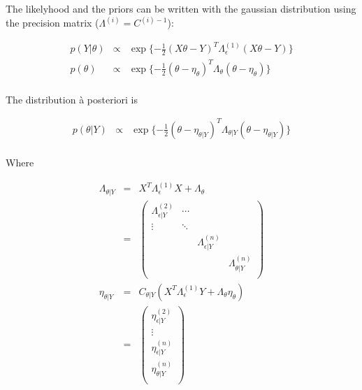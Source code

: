 \documentclass[final, paper=letter,5p,times,twocolumn]{elsarticle}
\theoremstyle{definition}
\begin{document}
The likelyhood and the priors can be written with the gaussian distribution using the precision matrix ($\Lambda^{(i)} = C^{(i)-1}$):


\begin{equation*}
  \left .
  \begin{array}{rcl}
    p(Y|\theta) & \propto & \exp\lbrace -\frac{1}{2} (X\theta - Y)^{T} \Lambda_{\epsilon}^{(1)} (X\theta - Y) \rbrace \\
    p(\theta)   & \propto & \exp\lbrace -\frac{1}{2} (\theta - \eta_{\theta})^{T} \Lambda_{\theta} (\theta - \eta_{\theta}) \rbrace \\
  \end{array}
  \right .
\end{equation*}

The distribution \`a posteriori is

\begin{equation*}
  \left .
  \begin{array}{rcl}
    p(\theta|Y) & \propto & \exp\lbrace -\frac{1}{2} (\theta - \eta_{\theta|Y})^{T} \Lambda_{\theta|Y} (\theta - \eta_{\theta|Y}) \rbrace \\
  \end{array}
  \right .
\end{equation*}

Where

\begin{equation}
  \left .
  \begin{array}{rcl}
    \Lambda_{\theta|Y} & = & X^{T}\Lambda_{\epsilon}^{(1)}X + \Lambda_{\theta}\\
    & = &
    \left (
    \begin{array}{cccc}
      \Lambda_{\epsilon|Y}^{(2)} & \cdots & & \\
      \vdots & \ddots && \\
      && \Lambda_{\epsilon|Y}^{(n)} & \\
      &&& \Lambda_{\theta|Y}^{(n)}  \\
  \end{array} 
    \right ) \\
    \eta_{\theta|Y}  & = & C_{\theta|Y} \left( X^{T}\Lambda_{\epsilon}^{(1)}Y + \Lambda_{\theta}\eta_{\theta} \right)\\
    & = &
    \left (
    \begin{array}{c}
      \eta_{\epsilon|Y}^{(2)} \\
      \vdots \\
      \eta_{\epsilon|Y}^{(n)} \\
      \eta_{\theta|Y}^{(n)} \\
    \end{array}
    \right )
  \end{array}
  \right .
  \label{Moments}
\end{equation}
\end{document}
